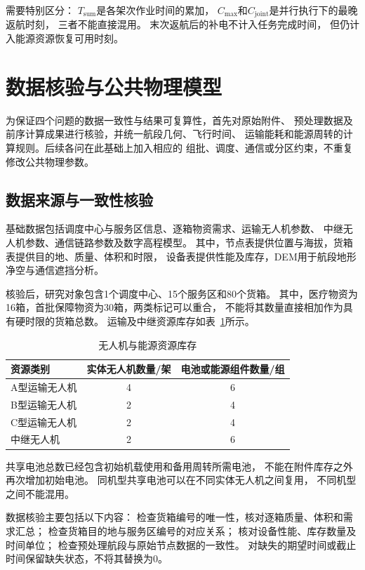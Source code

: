 \documentclass[bwprint]{gmcmthesis}
\begin{document}
需要特别区分：
$T_{\mathrm{sum}}$是各架次作业时间的累加，
$C_{\max}$和$C_{\mathrm{joint}}$是并行执行下的最晚返航时刻，
三者不能直接混用。
末次返航后的补电不计入任务完成时间，
但仍计入能源资源恢复可用时刻。



\section{数据核验与公共物理模型}

为保证四个问题的数据一致性与结果可复算性，首先对原始附件、
预处理数据及前序计算成果进行核验，并统一航段几何、飞行时间、
运输能耗和能源周转的计算规则。后续各问在此基础上加入相应的
组批、调度、通信或分区约束，不重复修改公共物理参数。

\subsection{数据来源与一致性核验}

基础数据包括调度中心与服务区信息、逐箱物资需求、运输无人机参数、
中继无人机参数、通信链路参数及数字高程模型。
其中，节点表提供位置与海拔，货箱表提供目的地、质量、体积和时限，
设备表提供性能及库存，DEM用于航段地形净空与通信遮挡分析。

核验后，研究对象包含1个调度中心、15个服务区和80个货箱。
其中，医疗物资为16箱，首批保障物资为30箱，两类标记可以重合，
不能将其数量直接相加作为具有硬时限的货箱总数。
运输及中继资源库存如表~\ref{tab:resource_inventory}所示。

\begin{table}[htbp]
    \centering
    \caption{无人机与能源资源库存}
    \label{tab:resource_inventory}
    \begin{tabular}{lcc}
        \toprule
        资源类别 & 实体无人机数量/架 & 电池或能源组件数量/组 \\
        \midrule
        A型运输无人机 & 4 & 6 \\
        B型运输无人机 & 2 & 4 \\
        C型运输无人机 & 2 & 4 \\
        中继无人机   & 2 & 6 \\
        \bottomrule
    \end{tabular}
\end{table}

共享电池总数已经包含初始机载使用和备用周转所需电池，
不能在附件库存之外再次增加初始电池。
同机型共享电池可以在不同实体无人机之间复用，
不同机型之间不能混用。

数据核验主要包括以下内容：
检查货箱编号的唯一性，核对逐箱质量、体积和需求汇总；
检查货箱目的地与服务区编号的对应关系；
核对设备性能、库存数量及时间单位；
检查预处理航段与原始节点数据的一致性。
对缺失的期望时间或截止时间保留缺失状态，不将其替换为0。
\end{document}
